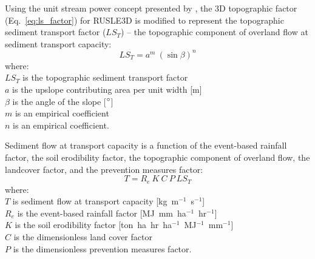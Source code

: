 \documentclass[gmd, manuscript]{copernicus}
\begin{document}
Using the unit stream power concept presented by \cite{Moore1986},
the 3D topographic factor (Eq.~\ref{eq:ls_factor}) 
for RUSLE3D is modified to represent 
the topographic sediment transport factor ($LS_T$) --
the topographic component 
of overland flow at sediment transport capacity:
%
\begin{equation}
\label{eq:lst_factor}
{LS_T = a^{m} ~ (\sin \beta)^{n}}
\end{equation}
%
{\small
\noindent
where: \\
\noindent
\hspace*{0.5em} $LS_T$ is the topographic sediment transport factor\\
\hspace*{0.5em} $a$ is the upslope contributing area per unit width [\unit{m}]\\
\hspace*{0.5em} $\beta$ is the angle of the slope [$^{\circ}$]\\
\hspace*{0.5em} $m$ is an empirical coefficient\\
\hspace*{0.5em} $n$ is an empirical coefficient.\\
}

\noindent
Sediment flow at transport capacity is a function of 
the event-based rainfall factor, the soil erodibility factor, 
the topographic component of overland flow,
the landcover factor, and the prevention measures factor:
%
\begin{equation}
\label{eq:usped}
{T = R_e ~ K ~ C ~ P ~ LS_T}
\end{equation}
{\small
\noindent
where: \\
\noindent
\hspace*{0.5em} $T$ is sediment flow at transport capacity [\unit{kg~m}$^{-1}$~\unit{s}$^{-1}$]\\ 
\hspace*{0.5em} $R_e$ is the event-based rainfall factor [\unit{MJ~mm~ha}$^{-1}$~\unit{hr}$^{-1}$]\\
\hspace*{0.5em} $K$ is the soil erodibility factor [\unit{ton~ha~hr~ha}$^{-1}$~\unit{MJ}$^{-1}$~\unit{mm}$^{-1}$]\\ 
\hspace*{0.5em} $C$ is the dimensionless land cover factor\\
\hspace*{0.5em} $P$ is the dimensionless prevention measures factor.\\
}
\end{document}
